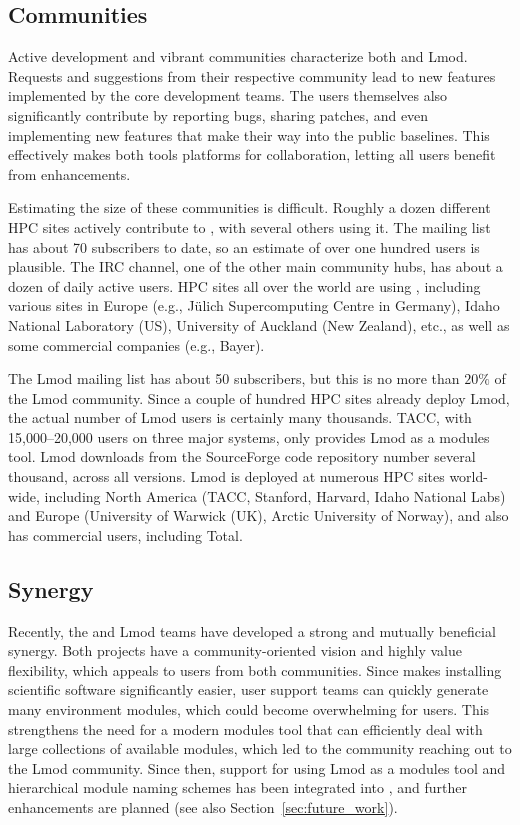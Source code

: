 \subsection{Communities}
\label{sec:communities}

Active development and vibrant communities characterize both \easybuild{} and Lmod.
Requests and suggestions from their respective community lead to new features
implemented by the core development teams. The users themselves also significantly
contribute by reporting bugs, sharing patches, and even implementing new features that
make their way into the public baselines. This effectively makes both tools
platforms for collaboration, letting all users benefit from enhancements.

Estimating the size of these communities is difficult. Roughly a dozen different HPC
sites actively contribute to \easybuild{}, with several others using it.
The \easybuild{} mailing list has about 70 subscribers to date, so an
estimate of over one hundred users is plausible. The \easybuild{} IRC channel, one of
the other main community hubs, has about a dozen of daily active users. HPC sites all
over the world are using \easybuild{}, including various sites in Europe
(e.g., J\"ulich Supercomputing Centre in Germany), Idaho National Laboratory (US),
University of Auckland (New Zealand), etc., as well as some commercial companies
(e.g., Bayer).

The Lmod mailing list has about 50 subscribers, but this is no more than $20\%$ of the
Lmod community. Since a couple of hundred HPC sites already deploy Lmod, the actual
number of Lmod users is certainly many thousands. TACC, with 15,000--20,000
users on three major systems, only provides Lmod as a modules tool. Lmod downloads
from the SourceForge code repository number several thousand, across all versions.
Lmod is deployed at numerous HPC sites world-wide, including North America (TACC,
Stanford, Harvard, Idaho National Labs) and Europe (University of Warwick (UK),
Arctic University of Norway), and also has commercial users, including Total.

\subsection{Synergy}

Recently, the \easybuild{} and Lmod teams have developed
a strong and mutually beneficial synergy. Both projects have a
community-oriented vision and highly value flexibility, which appeals to users
from both communities. Since \easybuild{} makes installing scientific software
significantly easier, user support teams can quickly generate many environment
modules, which could become overwhelming for users. This strengthens the need for a
modern modules tool that can efficiently deal with large collections of available
modules, which led to the \easybuild{} community reaching out to the Lmod community.
Since then, support for using Lmod as a modules tool and  hierarchical
module naming schemes has been integrated into \easybuild{}, and further
enhancements are planned (see also Section~\ref{sec:future_work}).

